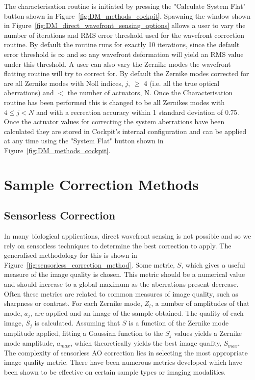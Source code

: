 The characterisation routine is initiated by pressing the "Calculate System Flat" button shown in Figure~\ref{fig:DM_methods_cockpit}. Spawning the window shown in Figure~\ref{fig:DM_direct_wavefront_sensing_options} allows a user to vary the number of iterations and RMS error threshold used for the wavefront correction routine. By default the routine runs for exactly 10 iterations, since the default error threshold is $\infty$ and so any wavefront deformation will yield an RMS value under this threshold. A user can also vary the Zernike modes the wavefront flatting routine will try to correct for. By default the Zernike modes corrected for are all Zernike modes with Noll indices, $j$, $\ge$ 4 (i.e. all the true optical aberrations) and $<$ the number of actuators, N. Once the Characterisation routine has been performed this is changed to be all Zernikes modes with $4 \le j < N$ and with a recreation accuracy within 1 standard deviation of 0.75.  Once the actuator values for correcting the system aberrations have been calculated they are stored in Cockpit's internal configuration and can be applied at any time using the "System Flat" button shown in Figure~\ref{fig:DM_methods_cockpit}.

\section{Sample Correction Methods}
\label{sec:sample_correction_methods}

\subsection{Sensorless Correction}
\label{subsec:sensorless_correction}

In many biological applications, direct wavefront sensing is not possible and so we rely on sensorless techniques to determine the best correction to apply. The generalised methodology for this is shown in Figure~\ref{fig:sensorless_correction_method}. Some metric, $S$, which gives a useful measure of the image quality is chosen. This metric should be a numerical value and should 
increase to a global maximum as the aberrations present decrease. Often these metrics are related to common measures of image quality, such as sharpness or contrast. For each Zernike mode, $Z_{i}$, a number of amplitudes of that mode, $a_{j}$, are applied and an image of the sample obtained. The quality of each image, $S_{j}$ is calculated. Assuming that $S$ is a function of the Zernike mode amplitude applied,	fitting a Gaussian function to the $S_{j}$ values yields a Zernike mode amplitude, $a_{max}$, which theoretically yields the best image quality, $S_{max}$. The complexity of sensorless AO correction lies in selecting the most appropriate image quality metric. There 
have been numerous metrics developed which have been shown to be effective on certain sample types or imaging modalities\cite{burke2015adaptive,booth2002adaptive,fienup2003aberration,debarre2008adaptive}.

